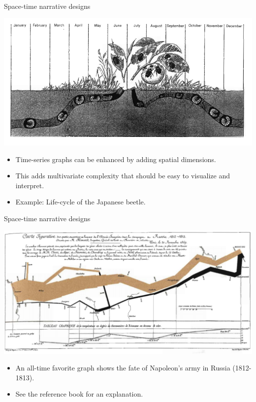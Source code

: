 \documentclass[
  ignorenonframetext,
]{beamer}
\begin{document}
\begin{frame}{Space-time narrative designs}
\protect\hypertarget{space-time-narrative-designs}{}
\begin{minipage}{1\textwidth}
\centering
\includegraphics[width=\textwidth]{excellence_figs/fig_21.png}
\end{minipage}
\hfill
\begin{minipage}{1\textwidth}
\footnotesize
\vspace{3mm}
\begin{itemize}
  \item Time-series graphs can be enhanced by adding spatial dimensions.
  \item This adds multivariate complexity that should be easy to visualize and interpret.
  \item Example: Life-cycle of the Japanese beetle.
\end{itemize}
\end{minipage}
\end{frame}

\begin{frame}{Space-time narrative designs}
\protect\hypertarget{space-time-narrative-designs-1}{}
\begin{minipage}{1\textwidth}
\centering
\includegraphics[width=\textwidth]{excellence_figs/fig_22.png}
\end{minipage}
\hfill
\begin{minipage}{1\textwidth}
\footnotesize
\vspace{3mm}
\begin{itemize}
  \item An all-time favorite graph shows the fate of Napoleon's army in Russia (1812-1813).
  \item See the reference book for an explanation.
\end{itemize}
\end{minipage}
\end{frame}
\end{document}
